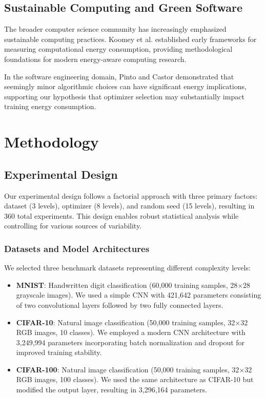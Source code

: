 \documentclass[conference]{IEEEtran}
\begin{document}
\subsection{Sustainable Computing and Green Software}

The broader computer science community has increasingly emphasized sustainable computing practices. Koomey et al. \cite{koomey2011implications} established early frameworks for measuring computational energy consumption, providing methodological foundations for modern energy-aware computing research.

In the software engineering domain, Pinto and Castor \cite{pinto2017energy} demonstrated that seemingly minor algorithmic choices can have significant energy implications, supporting our hypothesis that optimizer selection may substantially impact training energy consumption.

\section{Methodology}

\subsection{Experimental Design}

Our experimental design follows a factorial approach with three primary factors: dataset (3 levels), optimizer (8 levels), and random seed (15 levels), resulting in 360 total experiments. This design enables robust statistical analysis while controlling for various sources of variability.

\subsubsection{Datasets and Model Architectures}

We selected three benchmark datasets representing different complexity levels:

\begin{itemize}
    \item \textbf{MNIST}: Handwritten digit classification (60,000 training samples, 28$\times$28 grayscale images). We used a simple CNN with 421,642 parameters consisting of two convolutional layers followed by two fully connected layers.
    
    \item \textbf{CIFAR-10}: Natural image classification (50,000 training samples, 32$\times$32 RGB images, 10 classes). We employed a modern CNN architecture with 3,249,994 parameters incorporating batch normalization and dropout for improved training stability.
    
    \item \textbf{CIFAR-100}: Natural image classification (50,000 training samples, 32$\times$32 RGB images, 100 classes). We used the same architecture as CIFAR-10 but modified the output layer, resulting in 3,296,164 parameters.
\end{itemize}
\end{document}
